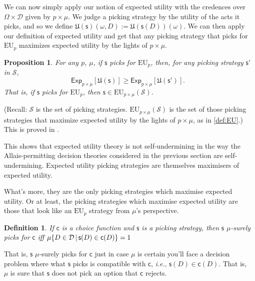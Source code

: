 \documentclass[a4paper,final]{article}
\newtheorem{definition}[theorem]{Definition}
\newtheorem{proposition}[theorem]{Proposition}
\newcommand\Exp{\mathsf{Exp}}
\newcommand\EU{\mathrm{EU}}
\newcommand\U{\mathfrak{U}} %
\newcommand{\D}{\mathcal{D}}
\renewcommand\S{\mathcal{S}}
\newcommand\s{\mathsf{s}}
\renewcommand\c{\mathsf{c}} %
\newcommand{\Strategies}{\S}
\newcommand\SetDelimiter[1][]{
	\nonscript\,#1\vert \allowbreak \nonscript\,\mathopen{}}
\providecommand\given{\SetDelimiter}
\renewcommand{\geq}{\geqslant}
\newenvironment{CCM rewritten}
{\begingroup\color{blue}} %
{\endgroup}              %
\begin{document}
We can now simply apply our notion of expected utility with the credences over $\Omega\times\D$ given by %
{$p\times\mu$.} We judge a picking strategy by the utility of the acts it picks, and so we define $\U(\s)(\omega,D):=\U(\s(D))(\omega)$. We can then apply our definition of expected utility and get that any picking strategy that picks for $\EU_p$ maximizes expected utility by the lights of %
{ $p\times\mu$.}
\begin{proposition}\label{thm:eu-self-rec}
	For any $p$, $\mu$, if $\s$ picks for $\EU_p$, then, for any picking strategy $\s'$ in $\S$,
	$$\Exp_{p\times\mu}[\U(\s)]\geq\Exp_{p\times\mu}[\U(\s')].$$
	That is, if $\s$ picks for $\EU_p$, then $\s\in\EU_{p\times\mu}(\Strategies)$. 
	\end{proposition}
(Recall: 
$\Strategies$ is the set of picking strategies. $\EU_{p\times \mu}(\Strategies)$ is the set of those picking strategies that maximize expected utility by the lights of %
{$p\times\mu$}, as in \cref{def:EU}.) This is proved in .


This shows that expected utility theory is not self-undermining in the way the Allais-permitting decision theories considered in the previous section are self-undermining. Expected utility picking strategies are themselves maximisers of expected utility. 

What's more, they are the only picking strategies which maximise expected utility. Or at least, the picking strategies which maximise expected utility are those that look like an $\EU_p$ strategy from $\mu$'s perspective. %

\begin{definition}\label{def:mu surely picks for}
If $\c$ is a choice function and $\s$ is a picking strategy, then $\s$ \emph{$\mu$-surely picks for $\c$} iff $\mu\{D \in \D \given \s(D)\in \c(D)\}=1$
\end{definition}
{That is, $\s$ $\mu$-surely picks for $\c$ just in case $\mu$ is certain you'll face a decision problem where what $\s$ picks is compatible with $\c$, \emph{i.e.}, $\s(D)\in\c(D)$. That is, $\mu$ is sure that $\s$ does not pick an option that $\c$ rejects. }
\end{document}
